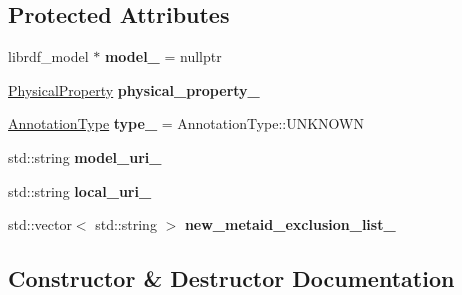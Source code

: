 \subsection*{Protected Attributes}
\begin{DoxyCompactItemize}
\item 
\mbox{\label{classomexmeta_1_1PhysicalPhenomenon_a9de43fc3fd94d3463c7fb9b8f684e78b}} 
librdf\+\_\+model $\ast$ {\bfseries model\+\_\+} = nullptr
\item 
\mbox{\label{classomexmeta_1_1PhysicalPhenomenon_a9e17807d60d9e3f797d6c02ef85cdfc6}} 
\hyperlink{classomexmeta_1_1PhysicalProperty}{Physical\+Property} {\bfseries physical\+\_\+property\+\_\+}
\item 
\mbox{\label{classomexmeta_1_1PhysicalPhenomenon_a74e88adb2099099e411b55cb9aa460a0}} 
\hyperlink{namespaceomexmeta_a1129ebb8a92218ebb27b9c76ac8462f7}{Annotation\+Type} {\bfseries type\+\_\+} = Annotation\+Type\+::\+U\+N\+K\+N\+O\+WN
\item 
\mbox{\label{classomexmeta_1_1PhysicalPhenomenon_a696cbc4f6490dd55d6bd41c7711cd0ec}} 
std\+::string {\bfseries model\+\_\+uri\+\_\+}
\item 
\mbox{\label{classomexmeta_1_1PhysicalPhenomenon_a114864dfae1f79ce4e3f430b7711516c}} 
std\+::string {\bfseries local\+\_\+uri\+\_\+}
\item 
\mbox{\label{classomexmeta_1_1PhysicalPhenomenon_a710756d611350395539dfa9f7fbf764e}} 
std\+::vector$<$ std\+::string $>$ {\bfseries new\+\_\+metaid\+\_\+exclusion\+\_\+list\+\_\+}
\end{DoxyCompactItemize}


\subsection{Constructor \& Destructor Documentation}
\mbox{\label{classomexmeta_1_1PhysicalPhenomenon_aa140516da97b03960175f9bc04ecf865}} 
